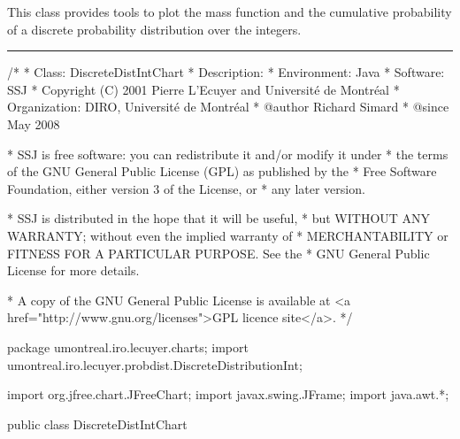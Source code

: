 
This class provides tools to plot the mass function and the cumulative
probability of a discrete probability distribution over the integers.


\bigskip\hrule
\begin{code}
\begin{hide}
/*
 * Class:        DiscreteDistIntChart
 * Description:  
 * Environment:  Java
 * Software:     SSJ 
 * Copyright (C) 2001  Pierre L'Ecuyer and Université de Montréal
 * Organization: DIRO, Université de Montréal
 * @author       Richard Simard
 * @since        May 2008

 * SSJ is free software: you can redistribute it and/or modify it under
 * the terms of the GNU General Public License (GPL) as published by the
 * Free Software Foundation, either version 3 of the License, or
 * any later version.

 * SSJ is distributed in the hope that it will be useful,
 * but WITHOUT ANY WARRANTY; without even the implied warranty of
 * MERCHANTABILITY or FITNESS FOR A PARTICULAR PURPOSE.  See the
 * GNU General Public License for more details.

 * A copy of the GNU General Public License is available at
   <a href="http://www.gnu.org/licenses">GPL licence site</a>.
 */
\end{hide}
package umontreal.iro.lecuyer.charts;
   import umontreal.iro.lecuyer.probdist.DiscreteDistributionInt;\begin{hide}

import org.jfree.chart.JFreeChart;
import javax.swing.JFrame;
import java.awt.*;
\end{hide}


public class DiscreteDistIntChart \begin{hide} {
   protected DiscreteDistributionInt dist;
   protected int a,b;
   protected XYLineChart cdfChart;
   protected XYLineChart probChart;
\end{hide}\end{code}


